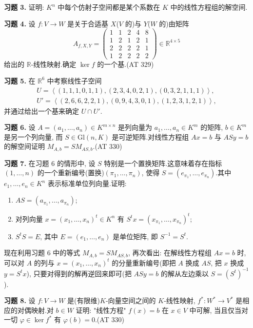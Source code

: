 \noindent\textbf{习题 3.} 证明: $K^n$ 中每个仿射子空间都是某个系数在 $K$ 中的线性方程组的解空间.

\noindent\textbf{习题 4.} 设 $f \colon V \longrightarrow W$ 是关于合适基 $X$($V$ 的)与 $Y$($W$ 的)由矩阵
\[
A_{f, X, Y} = \begin{pmatrix}
1 & 1 & 2 & 4 & 8 \\
1 & 2 & 1 & 2 & 1 \\
2 & 2 & 2 & 2 & 1 \\
1 & 2 & 2 & 2 & 2
\end{pmatrix} \in \mathbb{R}^{4 \times 5}
\]
给出的 $\mathbb{R}$-线性映射.确定 $\ker f$ 的一个基.(AT 329)

\noindent\textbf{习题 5.} 在 $\mathbb{R}^6$ 中考察线性子空间
\[
\begin{array}{l}
U = \left\langle (1, 1, 1, 0, 1, 1), (2, 3, 4, 0, 2, 1), (0, 3, 2, 1, 1, 1) \right\rangle, \\
U' = \left\langle (2, 6, 6, 2, 2, 1), (0, 9, 4, 3, 0, 1), (1, 2, 3, 1, 2, 1) \right\rangle,
\end{array}
\]
并通过给出一个基来确定 $U \cap U'$.

\noindent\textbf{习题 6.} 设 $A = (a_1, \ldots, a_n) \in K^{m \times n}$ 是列向量为 $a_1, \ldots, a_n \in K^m$ 的矩阵, $b \in K^m$ 是另一个列向量, 而 $S \in \mathrm{Gl}(n, K)$ 是可逆矩阵.对线性方程组 $Ax = b$ 与 $ASy = b$ 的解空间证明 $M_{A, b} = SM_{AS, b}$.(AT 330)

\noindent\textbf{习题 7.} 在习题 6 的情形中, 设 $S$ 特别是一个置换矩阵.这意味着存在指标 $(1, \ldots, n)$ 的一个重新编号(置换)$(\pi_1, \ldots, \pi_n)$, 使得 $S = (e_{\pi_1}, \ldots, e_{\pi_n})$.其中 $e_1, \ldots, e_n \in K^n$ 表示标准单位列向量.证明:
\begin{enumerate}
\item[(i)] $AS = (a_{\pi_1}, \ldots, a_{\pi_n})$;
\item[(ii)] 对列向量 $x = (x_1, \ldots, x_n)^t \in K^n$ 有 $S^t x = (x_{\pi_1}, \ldots, x_{\pi_n})^t$;
\item[(iii)] $S^t S = E$, 其中 $E = (e_1, \ldots, e_n)$ 是单位矩阵, 即 $S^{-1} = S^t$.
\end{enumerate}
现在利用习题 6 中的等式 $M_{A, b} = SM_{AS, b}$, 再次看出: 在解线性方程组 $Ax = b$ 时, 可以对 $A$ 的列与 $x = (x_1, \ldots, x_n)^t$ 的分量重新编号(即把 $A$ 换成 $AS$, 把 $x$ 换成 $y = S^t x$), 只要对得到的解再逆回来即可(把 $ASy = b$ 的解从左边乘以 $S = (S^t)^{-1}$).

\noindent\textbf{习题 8.} 设 $f \colon V \longrightarrow W$ 是(有限维)$K$-向量空间之间的 $K$-线性映射, $f^* \colon W^* \longrightarrow V^*$ 是相应的对偶映射.对 $b \in W$ 证明: "线性方程" $f(x) = b$ 在 $x \in V$ 中可解, 当且仅当对一切 $\varphi \in \ker f^*$ 有 $\varphi(b) = 0$.(AT 330)

